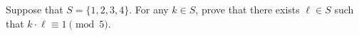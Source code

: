 Suppose that $S =  \{1, 2, 3, 4\}$. For any $k \in S$, prove that there exists $\ell \in S$ such that $k \cdot \ell \equiv 1 \pmod{5}$.